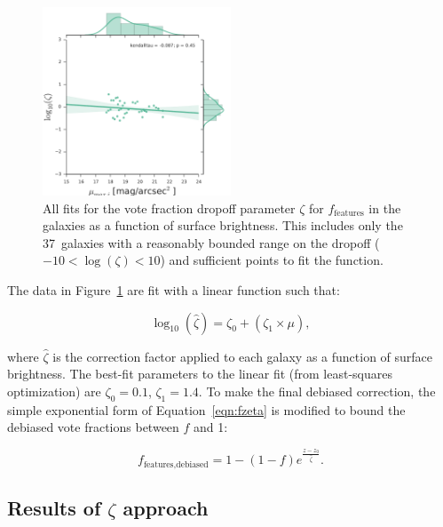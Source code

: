 \documentclass[twocolumn]{aastex6}
\begin{document}
\begin{figure}
\center
\includegraphics[width=0.50\textwidth]{figures/zeta_mu.pdf}
\caption{All fits for the vote fraction dropoff parameter $\zeta$ for $f_\textrm{features}$ in the \ferengi{} galaxies as a function of surface brightness. This includes only the 37~galaxies with a reasonably bounded range on the dropoff ($-10<\log(\zeta)<10$) and sufficient points to fit the function.}
\label{fig:zeta_mu}
\end{figure}

The data in Figure~\ref{fig:zeta_mu} are fit with a linear function such that:

\begin{equation}
\log_{10}(\hat\zeta) = \zeta_0 + (\zeta_1 \times \mu),
\label{eqn:zetafit}
\end{equation}

\noindent where $\hat\zeta$ is the correction factor applied to each galaxy as a function of surface brightness. The best-fit parameters to the linear fit (from least-squares optimization) are $\zeta_0=0.1$, $\zeta_1=1.4$. To make the final debiased correction, the simple exponential form of Equation~\ref{eqn:fzeta} is modified to bound the debiased vote fractions between $f$ and 1:

\begin{equation}
f_\textrm{features,debiased} = 1 - (1 - f)e^{\frac{z-z_0}{\hat\zeta}}.
\label{eqn:fzeta_mod}
\end{equation}

\subsection{Results of $\zeta$ approach}\label{ssec:zeta_results}
\end{document}
